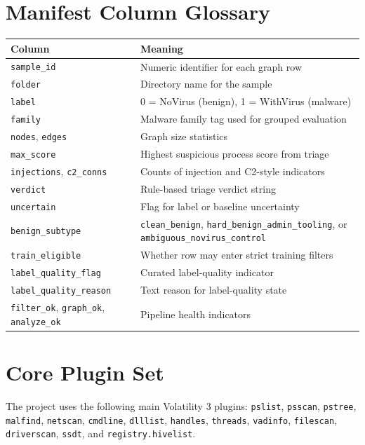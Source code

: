 \section{Manifest Column Glossary}
\begin{longtable}{p{}p{}}
\toprule
\textbf{Column} & \textbf{Meaning} \\
\midrule
\endhead
\texttt{sample\_id} & Numeric identifier for each graph row \\
\texttt{folder} & Directory name for the sample \\
\texttt{label} & 0 = NoVirus (benign), 1 = WithVirus (malware) \\
\texttt{family} & Malware family tag used for grouped evaluation \\
\texttt{nodes}, \texttt{edges} & Graph size statistics \\
\texttt{max\_score} & Highest suspicious process score from triage \\
\texttt{injections}, \texttt{c2\_conns} & Counts of injection and C2-style indicators \\
\texttt{verdict} & Rule-based triage verdict string \\
\texttt{uncertain} & Flag for label or baseline uncertainty \\
\texttt{benign\_subtype} & \texttt{clean\_benign}, \texttt{hard\_benign\_admin\_tooling}, or \texttt{ambiguous\_novirus\_control} \\
\texttt{train\_eligible} & Whether row may enter strict training filters \\
\texttt{label\_quality\_flag} & Curated label-quality indicator \\
\texttt{label\_quality\_reason} & Text reason for label-quality state \\
\texttt{filter\_ok}, \texttt{graph\_ok}, \texttt{analyze\_ok} & Pipeline health indicators \\
\bottomrule
\end{longtable}

\section{Core Plugin Set}
The project uses the following main Volatility 3 plugins: \texttt{pslist}, \texttt{psscan}, \texttt{pstree}, \texttt{malfind}, \texttt{netscan}, \texttt{cmdline}, \texttt{dlllist}, \texttt{handles}, \texttt{threads}, \texttt{vadinfo}, \texttt{filescan}, \texttt{driverscan}, \texttt{ssdt}, and \texttt{registry.hivelist}.

